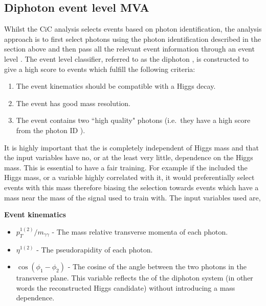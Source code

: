 \subsection{Diphoton event level MVA}
\label{sec:diphoton_bdt}

Whilst the CiC analysis selects events based on photon identification, the \MVA analysis approach is to first select photons using the photon identification \BDT described in the section above and then pass all the relevant event information through an event level \BDT. The event level classifier, referred to as the diphoton \BDT, is constructed to give a high score to events which fulfill the following criteria:

\begin{enumerate}
  \item The event kinematics should be compatible with a Higgs decay.
  \item The event has good mass resolution.
  \item The event contains two ``high quality" photons (i.e.~they have a high score from the photon ID \BDT).
\end{enumerate}

It is highly important that the \BDT is completely independent of Higgs mass and that the input variables have no, or at the least very little, dependence on the Higgs mass. This is essential to have a fair training. For example if the \BDT included the Higgs mass, or a variable highly correlated with it, it would preferentially select events with this mass therefore biasing the selection towards events which have a mass near the mass of the signal used to train with. The input variables used are,

\noindent\textbf{Event kinematics}
\begin{itemize}
  \item $p_{T}^{1(2)}/m_{\gamma\gamma}$ - The mass relative transverse momenta of each photon.
  \item $\eta^{1(2)}$ - The pseudorapidity of each photon.
  \item $\cos(\phi_{1}-\phi_{2})$ - The cosine of the angle between the two photons in the transverse plane. This variable reflects the \pT of the diphoton system (in other words the reconstructed Higgs candidate) without introducing a mass dependence.
\end{itemize}

